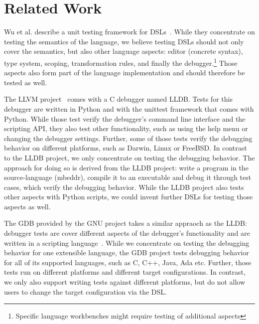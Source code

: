 \section{Related Work}

Wu et al. describe a unit testing framework for
\acp{DSL}~\cite{DBLP:conf/dsl/WuGM09}. 
While they concentrate on testing the semantics of the language, we believe testing
\acp{DSL} should not only cover the semantics, but also other language
aspects: editor (concrete syntax), type system, scoping, transformation rules,
and finally the debugger.\footnote{Specific language workbenches might require
testing of additional aspects} Those aspects also
form part of the language implementation and should therefore be tested as well.

The \ac{LLVM} project~\cite{LLDB} comes with a C debugger named \ac{LLDB}.
Tests for this debugger are written in Python and with the 
unittest framework that comes with Python.
While those test verify the debugger's command
line interface and the scripting API, they also test other functionality, such
as using the help menu or changing the debugger settings.
Further, some of those tests
verify the debugging behavior on different platforms, such as Darwin, Linux or
FreeBSD.
In contrast to the \ac{LLDB} project, we only concentrate on testing
the debugging behavior. The approach for doing so is derived from the \ac{LLDB} 
project:
write a program in the source-language (mbeddr), compile it to an executable and
debug it through test cases, which verify the debugging behavior. While the 
\ac{LLDB} project also tests other aspects with Python scripts, we could invent
further \acp{DSL} for testing those aspects as well.

The \ac{GDB} provided by the GNU project takes a similar
appraoch as the \ac{LLDB}: debugger tests are cover different aspects of the
debugger's functionality and are written in a scripting language~\cite{gdb}.
While we concentrate on testing the debugging behavior for one extensible
language, the \ac{GDB} project tests debugging behavior for all of its supported
languages, such as C, C++, Java, Ada etc. Further, those tests run on different
platforms and different target configurations. In contrast, we only also support
writing tests against different platforms, but do not allow users to change the
target configuration via the \ac{DSL}.

